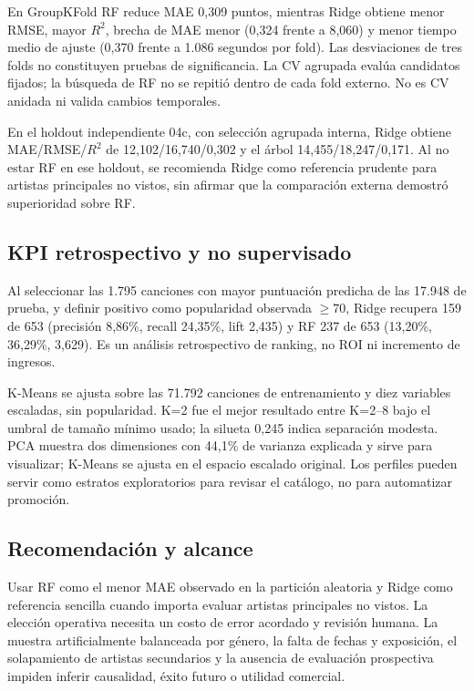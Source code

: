 En GroupKFold RF reduce MAE 0,309 puntos, mientras Ridge obtiene menor RMSE, mayor $R^2$,
brecha de MAE menor (0,324 frente a 8,060) y menor tiempo medio de ajuste (0,370 frente a
1.086 segundos por fold). Las desviaciones de tres folds no constituyen pruebas de significancia.
La CV agrupada evalúa candidatos fijados; la búsqueda de RF no se repitió dentro de cada fold
externo. No es CV anidada ni valida cambios temporales.

En el holdout independiente 04c, con selección agrupada interna, Ridge obtiene
MAE/RMSE/$R^2$ de 12,102/16,740/0,302 y el árbol 14,455/18,247/0,171. Al no estar RF en ese
holdout, se recomienda Ridge como referencia prudente para artistas principales no vistos,
sin afirmar que la comparación externa demostró superioridad sobre RF.

\subsection{KPI retrospectivo y no supervisado}

Al seleccionar las 1.795 canciones con mayor puntuación predicha de las 17.948 de prueba, y
definir positivo como popularidad observada $\geq70$, Ridge recupera 159 de 653 (precisión
8,86\%, recall 24,35\%, lift 2,435) y RF 237 de 653 (13,20\%, 36,29\%, 3,629). Es un análisis
retrospectivo de ranking, no ROI ni incremento de ingresos.

K-Means se ajusta sobre las 71.792 canciones de entrenamiento y diez variables escaladas, sin
popularidad. K=2 fue el mejor resultado entre K=2--8 bajo el umbral de tamaño mínimo usado; la
silueta 0,245 indica separación modesta. PCA muestra dos dimensiones con 44,1\% de varianza
explicada y sirve para visualizar; K-Means se ajusta en el espacio escalado original. Los
perfiles pueden servir como estratos exploratorios para revisar el catálogo, no para automatizar
promoción.

\subsection{Recomendación y alcance}

Usar RF como el menor MAE observado en la partición aleatoria y Ridge como referencia sencilla
cuando importa evaluar artistas principales no vistos. La elección operativa necesita un costo
de error acordado y revisión humana. La muestra artificialmente balanceada por género, la falta
de fechas y exposición, el solapamiento de artistas secundarios y la ausencia de evaluación
prospectiva impiden inferir causalidad, éxito futuro o utilidad comercial.


